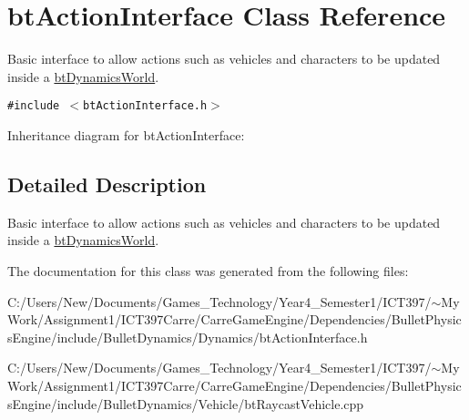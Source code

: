 \hypertarget{classbt_action_interface}{
\section{btActionInterface Class Reference}
\label{classbt_action_interface}
}
Basic interface to allow actions such as vehicles and characters to be updated inside a \hyperlink{classbt_dynamics_world}{btDynamicsWorld}.  


{\tt \#include $<$btActionInterface.h$>$}

Inheritance diagram for btActionInterface:

\subsection{Detailed Description}
Basic interface to allow actions such as vehicles and characters to be updated inside a \hyperlink{classbt_dynamics_world}{btDynamicsWorld}. 

The documentation for this class was generated from the following files:\begin{CompactItemize}
\item 
C:/Users/New/Documents/Games\_\-Technology/Year4\_\-Semester1/ICT397/$\sim$My Work/Assignment1/ICT397Carre/CarreGameEngine/Dependencies/BulletPhysicsEngine/include/BulletDynamics/Dynamics/btActionInterface.h\item 
C:/Users/New/Documents/Games\_\-Technology/Year4\_\-Semester1/ICT397/$\sim$My Work/Assignment1/ICT397Carre/CarreGameEngine/Dependencies/BulletPhysicsEngine/include/BulletDynamics/Vehicle/btRaycastVehicle.cpp\end{CompactItemize}
